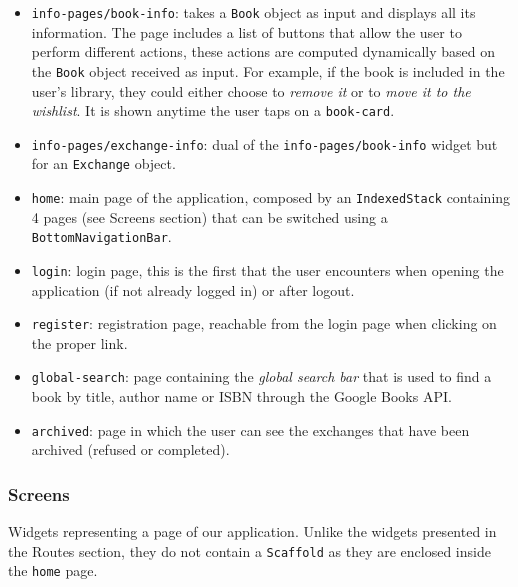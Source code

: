 \begin{itemize}
      \item \texttt{info-pages/book-info}:
            takes a \texttt{Book} object as input and displays all its information.
            The page includes a list of buttons that allow the user to perform different actions, these actions are computed dynamically based on the \texttt{Book} object received as input.
            For example, if the book is included in the user's library, they could either choose to \emph{remove it} or to \emph{move it to the wishlist}.
            It is shown anytime the user taps on a \texttt{book-card}.
      \item \texttt{info-pages/exchange-info}:
            dual of the \texttt{info-pages/book-info} widget but for an \texttt{Exchange} object.
      \item \texttt{home}:
            main page of the application, composed by an \texttt{IndexedStack} containing 4 pages (see Screens section) that can be switched using a \texttt{BottomNavigationBar}.
      \item \texttt{login}:
            login page, this is the first that the user encounters when opening the application (if not already logged in) or after logout.
      \item \texttt{register}:
            registration page, reachable from the login page when clicking on the proper link.
      \item \texttt{global-search}:
            page containing the \emph{global search bar} that is used to find a book by title, author name or ISBN through the Google Books API.
      \item \texttt{archived}:
            page in which the user can see the exchanges that have been archived (refused or completed).
\end{itemize}

\subsubsection{Screens}
Widgets representing a page of our application.
Unlike the widgets presented in the Routes section, they do not contain a \texttt{Scaffold} as they are enclosed inside the \texttt{home} page.

